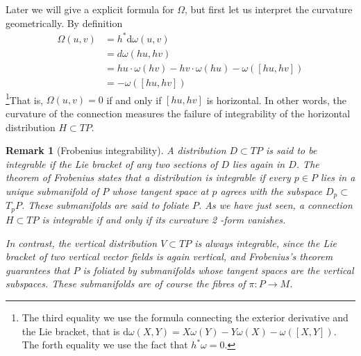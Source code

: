 \documentclass[11pt]{amsart}
\numberwithin{equation}{section}
\theoremstyle{plain}
\theoremstyle{plain}
\newtheorem{remksub}[thmsub]{Remark}
\numberwithin{equation}{section}
\begin{document}
Later we will give a explicit formula for $\Omega$, but first let us interpret the curvature geometrically. By definition
$$
\begin{aligned}
\Omega(u, v) &=h^*\mathrm{d}\omega(u,v)\\
&=d \omega(h u, h v) \\
&=hu\cdot \omega(h v)-hv\cdot \omega(h u)-\omega([h u, h v]) \\
&=-\omega([h u, h v])
\end{aligned}
$$  
\footnote{The third equality we use the formula connecting the exterior derivative and the Lie bracket, that is
$\mathrm{d}\omega(X,Y)=X\omega(Y)-Y\omega(X)-\omega([X,Y])
$. The forth equality we use the fact that $h^*\omega=0$.}That is, $\Omega(u,v)=0$ if and only if $[hu,hv]$ is horizontal. In other words, the curvature of the connection measures the failure of integrability of the horizontal distribution $H\subset TP$.
\begin{remksub}[Frobenius integrability]\normalfont
A distribution $D \subset TP$ is said to be integrable if the Lie bracket of any two sections of $D$ lies again in $D$. The theorem of Frobenius states that a distribution is integrable if every $p \in P$ lies in a unique submanifold of $P$ whose tangent space at $p$ agrees with the subspace $D_p \subset$ $T_pP$. These submanifolds are said to foliate $P$. As we have just seen, a connection $H \subset TP$ is integrable if and only if its curvature 2 -form vanishes.

In contrast, the vertical distribution $V \subset TP$ is always integrable, since the Lie bracket of two vertical vector fields is again vertical, and Frobenius's theorem guarantees that $P$ is foliated by submanifolds whose tangent spaces are the vertical subspaces. These submanifolds are of course the fibres of $\pi: P \rightarrow M$.
\end{remksub}
\end{document}
